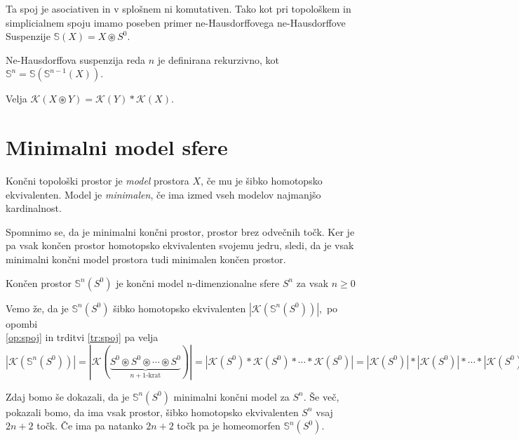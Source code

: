 \documentclass[mat1]{fmfdelo}
\newcommand{\Sus}{\mathbb S}
\begin{document}
Ta spoj je asociativen in v splošnem ni komutativen. Tako kot pri topološkem
 in simplicialnem spoju imamo poseben primer ne-Hausdorffovega ne-Hausdorffove Suspenzije
  $\Sus(X)=X \circledast S^0$.

  Ne-Hausdorffova suspenzija reda $n$ je definirana rekurzivno, kot  $\Sus^n=\Sus(\Sus^{n-1}(X))$.
  \begin{opomba}
    Velja $\mathcal{K}(X\circledast Y) = \mathcal{K}(Y)\ast \mathcal{K}(X)$.
    \label{op:spoj}
  \end{opomba}

  \section{Minimalni model sfere}


  \begin{definicija}
      Končni topološki prostor je \textit{model} prostora $X$, če mu je šibko homotopsko ekvivalenten. Model je \textit{minimalen}, če ima izmed vseh modelov najmanjšo kardinalnost.
  \end{definicija}
  
  Spomnimo se, da je minimalni končni prostor, prostor brez odvečnih točk. Ker je pa vsak končen prostor homotopsko ekvivalenten svojemu jedru, sledi, da je vsak minimalni končni model prostora tudi minimalen končen prostor.
  
  \begin{trditev}
      Končen prostor $\Sus^n(S^0)$ je končni model n-dimenzionalne sfere $S^n$ za vsak $n\geq 0$
  \end{trditev}
  
  \begin{dokaz}
      Vemo že, da je $\Sus^n(S^0)$ šibko homotopsko ekvivalenten $|\mathcal{K}(\Sus^n(S^0))|$,\ 
      po opombi\\ \ref{op:spoj} in trditvi \ref{tr:spoj} pa velja $|\mathcal{K}(\Sus^n(S^0))|=|\mathcal{K}(\underbrace{S^0\circledast S^0 \circledast \cdots \circledast S^0}_\text{$n+1$-krat})|=
      |\mathcal{K}(S^0)\ast\mathcal{K}(S^0) \ast \cdots \ast \mathcal{K}(S^0)|=|\mathcal{K}(S^0)|\ast
      |\mathcal{K}(S^0)| \ast \cdots \ast |\mathcal{K}(S^0)|=S^0\ast
      S^0 \ast \cdots \ast S^0=S^n$
  \end{dokaz}

  Zdaj bomo še dokazali, da je $\Sus^n(S^0)$ minimalni končni model za $S^n$. Še več, pokazali bomo, da ima vsak prostor, šibko homotopsko ekvivalenten $S^n$ vsaj $2n+2$ točk. Če ima pa natanko $2n+2$ točk pa je homeomorfen $\Sus^n(S^0)$.
\end{document}
